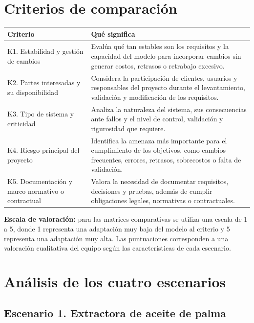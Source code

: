 \documentclass[11pt,a4paper]{article}
\begin{document}
	\section{Criterios de comparación}
	
	\begin{tabularx}{\textwidth}{|p{4.5cm}|Y|}
		\hline
		\textbf{Criterio} & \textbf{Qué significa} \\ \hline
		K1. Estabilidad y gestión de cambios &
		Evalúa qué tan estables son los requisitos y la capacidad del modelo para incorporar cambios sin generar costos, retrasos o retrabajo excesivo. \\ \hline
		K2. Partes interesadas y su disponibilidad &
		Considera la participación de clientes, usuarios y responsables del proyecto durante el levantamiento, validación y modificación de los requisitos. \\ \hline
		K3. Tipo de sistema y criticidad &
		Analiza la naturaleza del sistema, sus consecuencias ante fallos y el nivel de control, validación y rigurosidad que requiere. \\ \hline
		K4. Riesgo principal del proyecto &
		Identifica la amenaza más importante para el cumplimiento de los objetivos, como cambios frecuentes, errores, retrasos, sobrecostos o falta de validación. \\ \hline
		K5. Documentación y marco normativo o contractual &
		Valora la necesidad de documentar requisitos, decisiones y pruebas, además de cumplir obligaciones legales, normativas o contractuales. \\ \hline
	\end{tabularx}
	
	\textbf{Escala de valoración:} para las matrices comparativas se utiliza una escala de 1 a 5, donde 1 representa una adaptación muy baja del modelo al criterio y 5 representa una adaptación muy alta. Las puntuaciones corresponden a una valoración cualitativa del equipo según las características de cada escenario.
	
	
	\section{Análisis de los cuatro escenarios}
	
	\subsection{Escenario 1. Extractora de aceite de palma}
	
\end{document}
